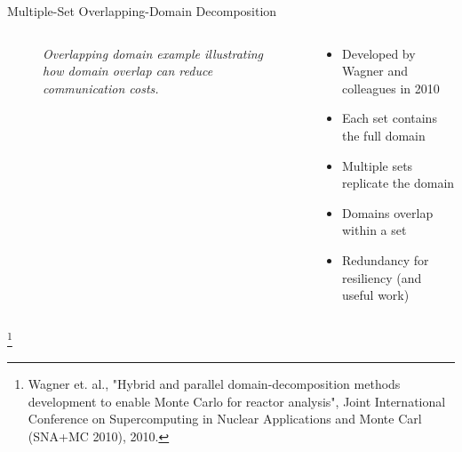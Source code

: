 \documentclass{beamer}
\begin{document}
\begin{frame}{Multiple-Set Overlapping-Domain Decomposition}

  \begin{columns}

    \begin{column}{0.5\textwidth}
      \begin{figure}[htpb!]
        \begin{center}
          \scalebox{0.75}{  }
        \end{center}
        \caption{\small \sl Overlapping domain example illustrating
          how domain overlap can reduce communication costs.}
      \end{figure}
    \end{column}

    \begin{column}{0.5\textwidth}
      \begin{itemize}
      \item Developed by Wagner and colleagues in 2010
        \medskip
      \item Each set contains the full domain
        \medskip
      \item Multiple sets replicate the domain
        \medskip
      \item Domains overlap within a set
        \medskip
      \item Redundancy for resiliency (and useful work)
      \end{itemize}
    \end{column}

  \end{columns}

  \let\thefootnote\relax\footnote{\tiny{Wagner et. al., "Hybrid and
      parallel domain-decomposition methods development to enable
      Monte Carlo for reactor analysis", Joint International
      Conference on Supercomputing in Nuclear Applications and Monte
      Carl (SNA+MC 2010), 2010.}}
\end{frame}
\end{document}
